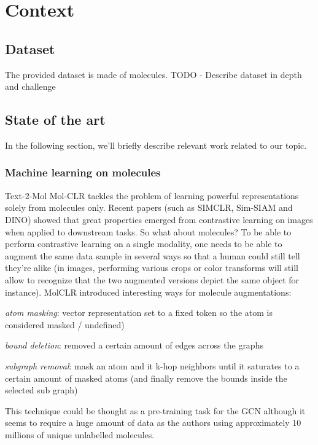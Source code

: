 \section{Context}
\label{sec:Context}


\subsection{Dataset}
\label{sec:dataset}
The provided dataset is made of molecules. 
\color{red}TODO - Describe dataset in depth and challenge \color{black}


\subsection{State of the art}
\label{sec:sota}
In the following section, we'll briefly describe relevant work related to our topic.

\subsubsection{Machine learning on molecules}
\label{sec:sota_molec}
Text-2-Mol\cite{text2mol}
Mol-CLR \cite{molCLR} tackles the problem of learning powerful representations solely from molecules only. Recent papers (such as SIMCLR\cite{SIMCLR}, Sim-SIAM \cite{simSIAM} and DINO\cite{DINO}) showed that great properties emerged from contrastive learning on images when applied to downstream tasks. So what about molecules? To be able to perform contrastive learning on a single modality, one needs to be able to augment the same data sample in several ways so that a human could still tell they're alike (in images, performing various crops or color transforms will still allow to recognize that the two augmented versions depict the same object for instance). MolCLR introduced interesting ways for molecule augmentations:

\textit{atom masking}: vector representation set to a fixed token so the atom is considered masked / undefined)

\textit{bound deletion}: removed a certain amount of edges across the graphs

\textit{subgraph removal}: mask an atom and it k-hop neighbors until it saturates to a certain amount of masked atoms (and finally remove the bounds inside the selected sub graph)

This technique could be thought as a pre-training task for the GCN although it seems to require a huge amount of data as the authors using approximately 10 millions of unique unlabelled molecules.

